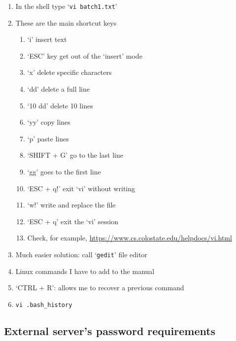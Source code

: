\documentclass[
  11pt,
  a4paper,
]{article}
\begin{document}
\begin{enumerate}
\def\labelenumi{\arabic{enumi}.}
\item
  In the shell type `\texttt{vi\ batch1.txt}'
\item
  These are the main shortcut keys

  \begin{enumerate}
  \def\labelenumii{\alph{enumii}.}
  \item
    `i' insert text
  \item
    `ESC' key get out of the `insert' mode
  \item
    `x' delete specific characters
  \item
    `dd' delete a full line
  \item
    `10 dd' delete 10 lines
  \item
    `yy' copy lines
  \item
    `p' paste lines
  \item
    `SHIFT + G' go to the last line
  \item
    `gg' goes to the first line
  \item
    `ESC + q!' exit `vi' without writing
  \item
    `w!' write and replace the file
  \item
    `ESC + q' exit the `vi' session
  \item
    Check, for example,
    \url{https://www.cs.colostate.edu/helpdocs/vi.html}
  \end{enumerate}
\item
  Much easier solution: call `\texttt{gedit}' file editor
\item
  Linux commands I have to add to the manual
\item
  `CTRL + R': allows me to recover a previous command
\item
  \texttt{vi\ .bash\_history}
\end{enumerate}

\hypertarget{password}{%
\subsection{External server's password requirements}\label{password}}
\end{document}
